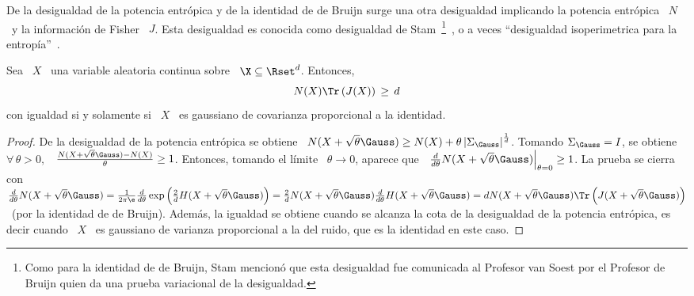 \begin{figure}[h!]
%
\begin{center}  \end{center}
%
%
\label{fig:SZ:deBruijnVerdu}
\end{figure}




\label{sec:SZ:Stam}


De la  desigualdad de  la potencia entr\'opica  y de  la identidad de  de Bruijn
surge  una otra  desigualdad implicando  la potencia  entr\'opica \  $N$ \  y la
informaci\'on de Fisher \ $J$.  Esta desigualdad es conocida como desigualdad de
Stam~\footnote{Como para  la identidad  de de Bruijn,  Stam mencion\'o  que esta
  desigualdad fue  comunicada al  Profesor van Soest  por el Profesor  de Bruijn
  quien  da una  prueba variacional  de la  desigualdad.}~\cite{CovTho06, Rio07,
  Sta59},     o    a    veces     ``desigualdad    isoperimetrica     para    la
entrop\'ia''~\cite{WanMad04}.
%
\begin{teorema}
  Sea  \  $X$   \  una  variable  aleatoria  continua   sobre  \  $\X  \subseteq
  \Rset^d$. Entonces,
  \[
  N(X) \Tr\left( J(X) \right) \, \ge \, d
  \]
  con igualdad si y solamente si \ $X$ \ es gaussiano de covarianza proporcional
  a la identidad.
\end{teorema}
%
\begin{proof}
  De la desigualdad de la potencia entr\'opica se obtiene \ $N(X + \sqrt{\theta}
  \Gauss)  \ge N(X)  + \theta  \left| \Sigma_\Gauss  \right|^{\frac1d}$. Tomando
  $\Sigma_\Gauss =  I$, se  obtiene \ $\forall  \, \theta  > 0,$ \  $\frac{N(X +
    \sqrt{\theta} \Gauss) - N(X)}{\theta}  \ge 1$.  Entonces, tomando el l\'imite
  \ $\theta \to 0$, aparece  que \ $\left. \frac{d}{d\theta} N(X + \sqrt{\theta}
    \Gauss)   \right|_{\theta  =   0}  \ge   1$.   La   prueba  se   cierra  con
  $\frac{d}{d\theta}  N(X   +  \sqrt{\theta}   \Gauss)  =  \frac{1}{2   \pi  \e}
  \frac{d}{d\theta}  \exp\left( \frac2d  H(X +  \sqrt{\theta} \Gauss)  \right) =
  \frac2d  N(X +  \sqrt{\theta}  \Gauss) \frac{d}{d\theta}  H(X +  \sqrt{\theta}
  \Gauss) = d N(X +  \sqrt{\theta} \Gauss) \Tr\left( J(X + \sqrt{\theta} \Gauss)
  \right)$ \ (por la identidad de  de Bruijn).  Adem\'as, la igualdad se obtiene
  cuando se  alcanza la cota  de la desigualdad  de la potencia  entr\'opica, es
  decir cuando \ $X$ \ es gaussiano de varianza proporcional a la del ruido, que
  es la identidad en este caso.
\end{proof}
